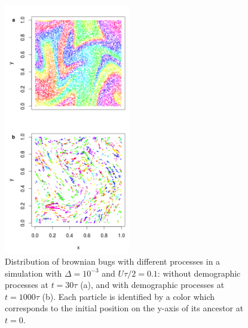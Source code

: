 \begin{figure}[H]
\begin{center}
\includegraphics[width=0.49\textwidth]{../code/figure/spatial_distribution_Fig2.png}
  \caption{Distribution of brownian bugs with different processes in a simulation with $\Delta=10^{-3}$ and $U\tau/2=0.1$: without demographic processes at $t=30\tau$ (a), and with demographic processes at $t=1000\tau$ (b). Each particle is identified by a color which corresponds to the initial position on the y-axis of its ancestor at $t=0$.}
  \label{fig:spatial_fig2}
\end{center}
  \end{figure}


